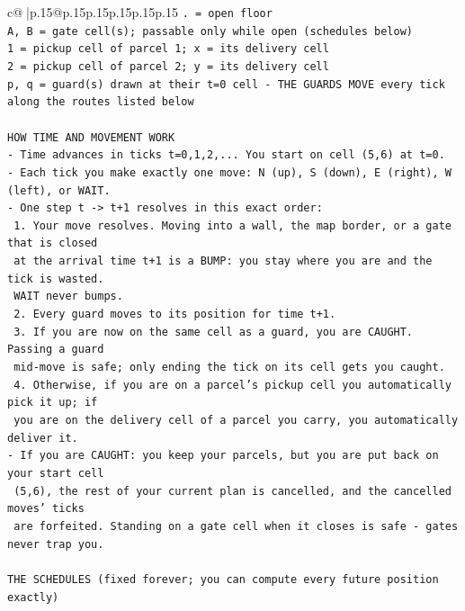 \documentclass{article}
\begin{document}
{\begin{supertabular}{c@{$\;$}|p{.15\linewidth}@{}p{.15\linewidth}p{.15\linewidth}p{.15\linewidth}p{.15\linewidth}p{.15\linewidth}}
{{{\texttt{. = open floor} \\
\texttt{A, B = gate cell(s); passable only while open (schedules below)} \\
\texttt{1 = pickup cell of parcel 1; x = its delivery cell} \\
\texttt{2 = pickup cell of parcel 2; y = its delivery cell} \\
\texttt{p, q = guard(s) drawn at their t=0 cell {-} THE GUARDS MOVE every tick along the routes listed below} \\
\\ 
\texttt{HOW TIME AND MOVEMENT WORK} \\
\texttt{{-} Time advances in ticks t=0,1,2,... You start on cell (5,6) at t=0.} \\
\texttt{{-} Each tick you make exactly one move: N (up), S (down), E (right), W (left), or WAIT.} \\
\texttt{{-} One step t {-}> t+1 resolves in this exact order:} \\
\texttt{  1. Your move resolves. Moving into a wall, the map border, or a gate that is closed} \\
\texttt{     at the arrival time t+1 is a BUMP: you stay where you are and the tick is wasted.} \\
\texttt{     WAIT never bumps.} \\
\texttt{  2. Every guard moves to its position for time t+1.} \\
\texttt{  3. If you are now on the same cell as a guard, you are CAUGHT. Passing a guard} \\
\texttt{     mid{-}move is safe; only ending the tick on its cell gets you caught.} \\
\texttt{  4. Otherwise, if you are on a parcel's pickup cell you automatically pick it up; if} \\
\texttt{     you are on the delivery cell of a parcel you carry, you automatically deliver it.} \\
\texttt{{-} If you are CAUGHT: you keep your parcels, but you are put back on your start cell} \\
\texttt{  (5,6), the rest of your current plan is cancelled, and the cancelled moves' ticks} \\
\texttt{  are forfeited. Standing on a gate cell when it closes is safe {-} gates never trap you.} \\
\\ 
\texttt{THE SCHEDULES (fixed forever; you can compute every future position exactly)} \\
}}}
\end{supertabular}}
\end{document}
